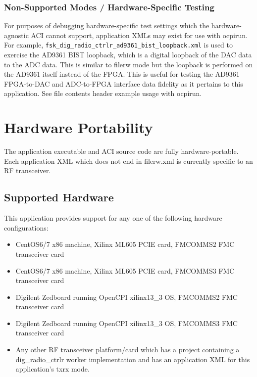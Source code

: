 \begin{landscape}
      \subsubsection{Non-Supported Modes / Hardware-Specific Testing}

        For purposes of debugging hardware-specific test settings which the
        hardware-agnostic ACI cannot support, application XMLs may exist for use
        with ocpirun. For example,
        \texttt{fsk\_dig\_radio\_ctrlr\_ad9361\_bist\_loopback.xml} is used
        to exercise the AD9361 BIST loopback, which is a digital loopback of
        the DAC data to the ADC data. This is similar to filerw mode but the
        loopback is performed on the AD9361 itself instead of the FPGA. This
        is useful for testing the AD9361 FPGA-to-DAC and ADC-to-FPGA interface
        data fidelity as it pertains to this application. See file contents
        header example usage with ocpirun.

\end{landscape}

\section{Hardware Portability}

  The application executable and ACI source code are fully hardware-portable.
  Each application XML which does not end in filerw.xml is
  currently specific
  to an RF transceiver.

  \subsection{Supported Hardware}
    This application provides support for
    any one of the following hardware configurations:
    \begin{itemize}
      \item CentOS6/7 x86 machine, Xilinx ML605 PCIE card, FMCOMMS2 FMC
        transceiver card
      \item CentOS6/7 x86 machine, Xilinx ML605 PCIE card, FMCOMMS3 FMC
        transceiver card
      \item Digilent Zedboard running OpenCPI xilinx13\_3 OS, FMCOMMS2 FMC
        transceiver card
      \item Digilent Zedboard running OpenCPI xilinx13\_3 OS, FMCOMMS3 FMC
        transceiver card
      \item Any other RF transceiver platform/card which has a project
        containing a
        dig\_radio\_ctrlr worker implementation and has an application
        XML for this application's txrx mode.
    \end{itemize}

